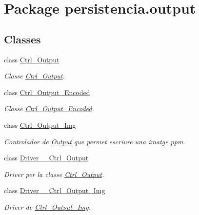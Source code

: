 \hypertarget{namespacepersistencia_1_1output}{}\section{Package persistencia.\+output}
\label{namespacepersistencia_1_1output}
\subsection*{Classes}
\begin{DoxyCompactItemize}
\item 
class \hyperlink{classpersistencia_1_1output_1_1Ctrl__Output}{Ctrl\+\_\+\+Output}
\begin{DoxyCompactList}\small\item\em Classe \hyperlink{classpersistencia_1_1output_1_1Ctrl__Output}{Ctrl\+\_\+\+Output}. \end{DoxyCompactList}\item 
class \hyperlink{classpersistencia_1_1output_1_1Ctrl__Output__Encoded}{Ctrl\+\_\+\+Output\+\_\+\+Encoded}
\begin{DoxyCompactList}\small\item\em Classe \hyperlink{classpersistencia_1_1output_1_1Ctrl__Output__Encoded}{Ctrl\+\_\+\+Output\+\_\+\+Encoded}. \end{DoxyCompactList}\item 
class \hyperlink{classpersistencia_1_1output_1_1Ctrl__Output__Img}{Ctrl\+\_\+\+Output\+\_\+\+Img}
\begin{DoxyCompactList}\small\item\em Controlador de \hyperlink{classpersistencia_1_1output_1_1Output}{Output} que permet escriure una imatge ppm. \end{DoxyCompactList}\item 
class \hyperlink{classpersistencia_1_1output_1_1Driver____Ctrl__Output}{Driver\+\_\+\+\_\+\+Ctrl\+\_\+\+Output}
\begin{DoxyCompactList}\small\item\em Driver per la classe \hyperlink{classpersistencia_1_1output_1_1Ctrl__Output}{Ctrl\+\_\+\+Output}. \end{DoxyCompactList}\item 
class \hyperlink{classpersistencia_1_1output_1_1Driver____Ctrl__Output__Img}{Driver\+\_\+\+\_\+\+Ctrl\+\_\+\+Output\+\_\+\+Img}
\begin{DoxyCompactList}\small\item\em Driver de \hyperlink{classpersistencia_1_1output_1_1Ctrl__Output__Img}{Ctrl\+\_\+\+Output\+\_\+\+Img}. \end{DoxyCompactList}\item 

\end{DoxyCompactItemize}

